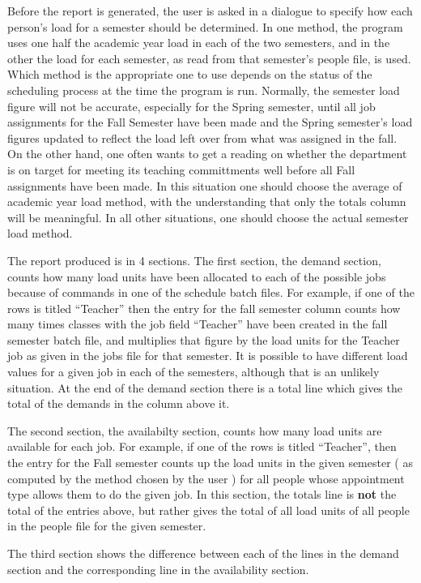 \begin{description}
\begin{description}
 Before the report is generated, the user is asked
in a dialogue to specify how each person's load for a semester
should be determined. In one method, the program uses one half the academic
year load in each of the two semesters, and in the other the load for each
semester, as read from that semester's people file, is used. Which method is
the appropriate one to use depends on the status of the scheduling process
at the time the program is run. Normally, the semester load figure will not
be accurate, especially for the Spring semester, until all job assignments
for the Fall Semester have been made and the Spring semester's load
figures  updated to reflect the load left over from what was
assigned in the fall. On the other hand, one often wants to get a reading
on whether the department is on target for meeting its teaching committments
well before all Fall assignments have been made. In this situation one should
choose the average of academic year load method, with the understanding that
only the totals column will be meaningful. In all other situations, one should
choose the actual semester load method. 

The report produced is in 4 sections. The first section, the demand section,
counts how many load units have been allocated to each of the possible
jobs because of commands in one of the schedule batch files. For example,
if one of the rows is titled ``Teacher'' then the entry for the fall semester
column counts how many times classes with the job field ``Teacher'' have
been created in the fall semester batch file, and multiplies that figure by
the load units for the Teacher job as given in the jobs file for that 
semester. It is possible to have different load values for a given job
in each of the semesters, although that is an unlikely situation. At the
end of the demand section there is a total line which gives the total of
the demands in the column above it.

The second section, the availabilty section, counts how many load units
are available for each job. For example, if one of the rows is titled 
``Teacher'', then the entry for the Fall semester counts up the load units
in the given semester ( as computed by the method chosen by the user )
for all people whose appointment type allows them to do the given job.
In this section, the totals line is {\bf not} the total of the entries above,
but rather gives the total of all load units of all people in the people file
for the given semester. 

The third section shows the difference between each of the lines in the
demand section and the corresponding line in the availability section.


\end{description}
\end{description}
